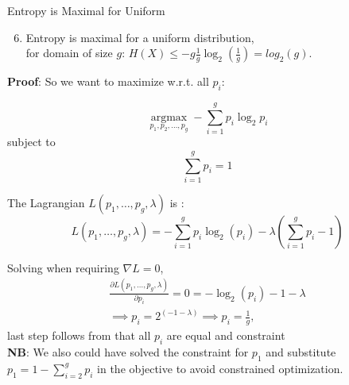 \documentclass[11pt,compress,t,notes=noshow, xcolor=table]{beamer}
\begin{document}
\begin{vbframe}{Entropy is Maximal for Uniform}
\begin{enumerate}
\setcounter{enumi}{5}
\item Entropy is maximal for a uniform distribution,\\
      for domain of size $g$:  
      $H(X) \leq -g\frac{1}{g} \log_2(\frac{1}{g}) = log_2(g)$.
\end{enumerate}
\vspace{0.2cm}

\lz
\textbf{Proof}: 
So we want to maximize w.r.t. all $p_i$:

  $$\underset{p_{1}, p_{2}, \ldots, p_{g}}{\operatorname{argmax}} -\sum_{i=1}^{g} p_{i} \log _{2} p_{i}$$
  subject to
  $$\sum_{i=1}^g p_i = 1$$
  
  \framebreak
  The Lagrangian $L(p_1, \ldots, p_g, \lambda)$ is :
  $$L(p_1, \ldots, p_g, \lambda) = - \sum_{i=1}^g p_i \log_2(p_i) - \lambda \left( \sum_{i=1}^g p_i - 1 \right)$$
  
  Solving when requiring $\nabla L = 0$,
  \begin{gather*}
    \frac{\partial L(p_1, \ldots, p_g, \lambda)}{\partial p_i} = 0 = - \log_2(p_i) - 1 - \lambda \\
    \implies p_i = 2^{(-1 - \lambda)} \implies p_i = \frac{1}{g},
  \end{gather*}
  last step follows from that all $p_i$ are equal and constraint
  \vspace{0.2cm}\\
  \textbf{NB}: We also could have solved the constraint for $p_1$ and substitute $p_1=1-\sum_{i=2}^{g} p_i$ in the objective to avoid constrained optimization.

\end{vbframe}

\endlecture
\end{document}
